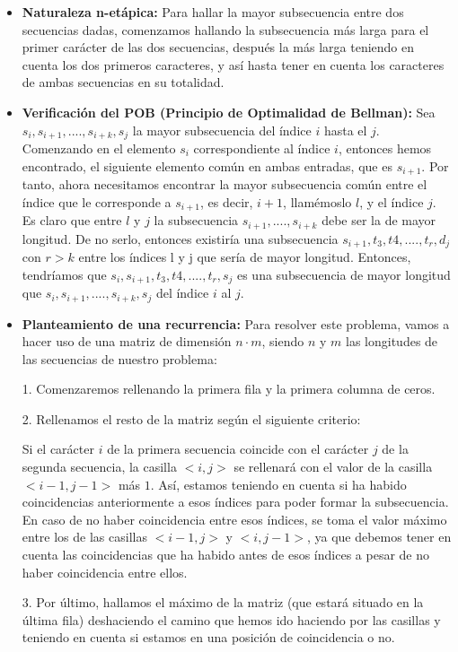 \documentclass[10pt,a4paper]{article}
\begin{document}
\begin{itemize}
	\item \textbf{Naturaleza n-etápica:} Para hallar la mayor subsecuencia entre dos secuencias dadas, comenzamos hallando la subsecuencia más larga para el primer carácter de las dos secuencias, después la más larga teniendo en cuenta los dos primeros caracteres, y así hasta tener en cuenta los caracteres de ambas secuencias en su totalidad.
	\item \textbf{Verificación del POB (Principio de Optimalidad de Bellman):} Sea $ s_i, s_{i+1},...., s_{i+k}, s_j$ la mayor subsecuencia del índice \(i\) hasta el \(j\).
	Comenzando en el elemento $s_i$ correspondiente al índice $i$, entonces hemos encontrado, el siguiente elemento común en ambas entradas, que es $s_{i+1}$. Por tanto, ahora necesitamos encontrar la mayor subsecuencia común entre el índice que le corresponde a $s_{i+1}$, es decir, $i+1$, llamémoslo $l$, y el índice $j$. Es claro que entre $l$ y $j$ la subsecuencia $s_{i+1},...., s_{i+k}$ debe ser la de mayor longitud. De no serlo, entonces existiría una subsecuencia $s_{i+1}, t_3, t4, ...., t_r, d_j$ con $r>k$ entre los índices l y j que sería de mayor longitud. Entonces, tendríamos que $s_i, s_{i+1}, t_3, t4, ...., t_r, s_j$ es una subsecuencia de mayor longitud que $ s_i, s_{i+1},...., s_{i+k}, s_j$ del índice $i$ al $j$.
	\item \textbf{Planteamiento de una recurrencia:} Para resolver este problema, vamos a hacer uso de una matriz de dimensión $n \cdot m$, siendo $n$ y $m$ las longitudes de las secuencias de nuestro problema: 
	
	1. Comenzaremos rellenando la primera fila y la primera columna de ceros.
	
	2. Rellenamos el resto de la matriz según el siguiente criterio:
	
	Si el carácter $i$ de la primera secuencia coincide con el carácter $j$ de la segunda secuencia, la casilla $<i,j>$ se rellenará con el valor de la casilla $<i-1,j-1>$ más $1$. Así, estamos teniendo en cuenta si ha habido coincidencias anteriormente a esos índices para poder formar la subsecuencia. En caso de no haber coincidencia entre esos índices, se toma el valor máximo entre los de las casillas $<i-1,j>$ y $<i,j-1>$, ya que debemos tener en cuenta las coincidencias que ha habido antes de esos índices a pesar de no haber coincidencia entre ellos.
	
	3. Por último, hallamos el máximo de la matriz (que estará situado en la última fila) deshaciendo el camino que hemos ido haciendo por las casillas y teniendo en cuenta si estamos en una posición de coincidencia o no.
	

\end{itemize}
\end{document}
